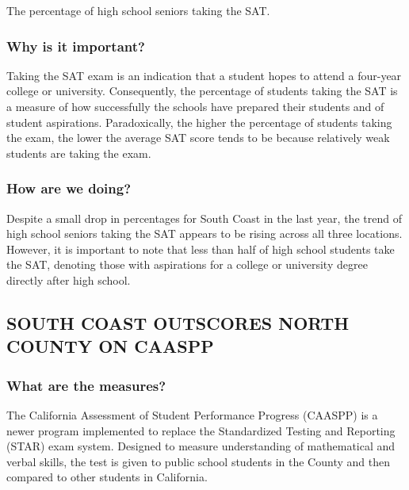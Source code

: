 \documentclass[]{book}
\theoremstyle{definition}
\theoremstyle{definition}
\theoremstyle{definition}
\theoremstyle{remark}
\begin{document}
The percentage of high school seniors taking the SAT.

\subsubsection*{Why is it important?}\label{why-is-it-important-13}

Taking the SAT exam is an indication that a student hopes to attend a
four-year college or university. Consequently, the percentage of
students taking the SAT is a measure of how successfully the schools
have prepared their students and of student aspirations. Paradoxically,
the higher the percentage of students taking the exam, the lower the
average SAT score tends to be because relatively weak students are
taking the exam.

\subsubsection*{How are we doing?}\label{how-are-we-doing-17}

Despite a small drop in percentages for South Coast in the last year,
the trend of high school seniors taking the SAT appears to be rising
across all three locations. However, it is important to note that less
than half of high school students take the SAT, denoting those with
aspirations for a college or university degree directly after high
school.

\subsection*{SOUTH COAST OUTSCORES NORTH COUNTY ON
CAASPP}\label{south-coast-outscores-north-county-on-caaspp}

\subsubsection*{What are the measures?}\label{what-are-the-measures-2}

The California Assessment of Student Performance Progress (CAASPP) is a
newer program implemented to replace the Standardized Testing and
Reporting (STAR) exam system. Designed to measure understanding of
mathematical and verbal skills, the test is given to public school
students in the County and then compared to other students in
California.
\end{document}

